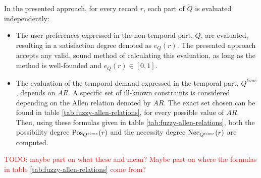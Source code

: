 

In the presented approach, for every record $r$, each part of $\tilde{Q}$ is evaluated independently:
\begin{itemize}
\item
The user preferences expressed in the non-temporal part, $Q$, are evaluated, resulting in a satisfaction degree denoted as $e_Q(r)$. The presented approach accepts any valid, sound method of calculating this evaluation, as long as the method is well-founded and $e_Q(r) \in \left[0,1\right]$.
\item
The evaluation of the temporal demand expressed in the temporal part, $Q^{time}$, depends on $AR$. A specific set of ill-known constraints\cite{Pon11} is considered depending on the Allen relation denoted by $AR$. The exact set chosen can be found in table \ref{tab:fuzzy-allen-relations}, for every possible value of $AR$. Then, using these formulas given in table \ref{tab:fuzzy-allen-relations}, both the possibility degree $\operatorname{Pos}_{Q^{time}}(r)$ and the necessity degree $\operatorname{Nec}_{Q^{time}}(r)$ are computed.
\end{itemize}

\textcolor{red}{TODO: maybe part on what these and mean? Maybe part on where the formulas in table \ref{tab:fuzzy-allen-relations} come from?}

